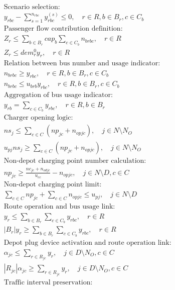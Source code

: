\documentclass[10pt]{article}
\begin{document}
\begin{align*}
&\text{Scenario selection:} \\
& y_{rbc} - \sum_{s=1}^{n_{rbc}} y^{(s)}_{rbc} \leq 0, \quad r \in R, b \in B_r, c \in C_b \tag{14} \\
&\text{Passenger flow contribution definition:} \\
& Z_r \leq \sum_{b \in B_r} cap_b \sum_{c \in C_b} n_{brbc}, \quad r \in R \tag{15} \\
& Z_r \leq dem^0_r y_r, \quad r \in R \tag{16} \\
&\text{Relation between bus number and usage indicator:} \\
& n_{brbc} \geq y_{rbc}, \quad r \in R, b \in B_r, c \in C_b \tag{17} \\
& n_{brbc} \leq u_{brb} y_{rbc}, \quad r \in R, b \in B_r, c \in C_b \tag{18} \\
&\text{Aggregation of bus usage indicator:} \\
& y_{rb} = \sum_{c \in C_b} y_{rbc}, \quad r \in R, b \in B_r \tag{19} \\
&\text{Charger opening logic:} \\
& ns_j \leq \sum_{c \in C} (np_{jc} + n_{opjc}), \quad j \in N \setminus N_O \tag{20} \\
& u_{pj} ns_j \geq \sum_{c \in C} (np_{jc} + n_{opjc}), \quad j \in N \setminus N_O \tag{21} \\
&\text{Non-depot charging point number calculation:} \\
& np_{jc} \geq \frac{nc_{jc} + n_{odjc}}{u_{cc}} - n_{opjc}, \quad j \in N \setminus D, c \in C \tag{22} \\
&\text{Non-depot charging point limit:} \\
& \sum_{c \in C} np_{jc} + \sum_{c \in C} n_{opjc} \leq u_{pj}, \quad j \in N \setminus D \tag{23} \\
&\text{Route operation and bus usage link:} \\
& y_r \leq \sum_{b \in B_r} \sum_{c \in C_b} y_{rbc}, \quad r \in R \tag{24} \\
& |B_r| y_r \geq \sum_{b \in B_r} \sum_{c \in C_b} y_{rbc}, \quad r \in R \tag{25} \\
&\text{Depot plug device activation and route operation link:} \\
& \alpha_{jc} \leq \sum_{r \in R_{jc}} y_r, \quad j \in D \setminus N_O, c \in C \tag{26} \\
& |R_{jc}| \alpha_{jc} \geq \sum_{r \in R_{jc}} y_r, \quad j \in D \setminus N_O, c \in C \tag{27} \\
&\text{Traffic interval preservation:} \\

\end{align*}
\end{document}
